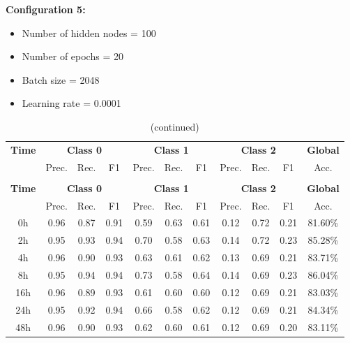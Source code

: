 \documentclass[12pt,oneside]{book} %
\begin{document}
\noindent \textbf{Configuration 5:}
\begin{multicols}{2}
    \begin{itemize}
        \item Number of hidden nodes = 100
        \item Number of epochs = 20
    \end{itemize}
    \begin{itemize}
         \item Batch size = 2048
         \item Learning rate = 0.0001
    \end{itemize}
\end{multicols}

\setlength\LTleft{1cm}
\begin{longtable}{ c ccc ccc ccc c}
\caption{Performance metrics of the LNN model for configuration 5} \\
\toprule
\textbf{Time} & \multicolumn{3}{c}{\textbf{Class 0}} & \multicolumn{3}{c}{\textbf{Class 1}} & \multicolumn{3}{c}{\textbf{Class 2}} & \textbf{Global} \\
               & Prec. & Rec. & F1  & Prec. & Rec. & F1   & Prec. & Rec. & F1  & Acc. \\
\midrule
\endfirsthead

\caption[]{(continued)} \\
\toprule
\textbf{Time} & \multicolumn{3}{c}{\textbf{Class 0}} & \multicolumn{3}{c}{\textbf{Class 1}} & \multicolumn{3}{c}{\textbf{Class 2}} & \textbf{Global} \\
               & Prec. & Rec. & F1  & Prec. & Rec. & F1   & Prec. & Rec. & F1  & Acc. \\
\midrule
\endhead

\bottomrule
\endfoot

\bottomrule
\endlastfoot

0h             & 0.96  & 0.87 & 0.91 & 0.59  & 0.63 & 0.61  & 0.12  & 0.72 & 0.21 & 81.60\% \\
2h             & 0.95  & 0.93 & 0.94 & 0.70  & 0.58 & 0.63  & 0.14  & 0.72 & 0.23 & 85.28\% \\
4h             & 0.96  & 0.90 & 0.93 & 0.63  & 0.61 & 0.62  & 0.13  & 0.69 & 0.21 & 83.71\% \\
8h             & 0.95  & 0.94 & 0.94 & 0.73  & 0.58 & 0.64  & 0.14  & 0.69 & 0.23 & 86.04\% \\
16h            & 0.96  & 0.89 & 0.93 & 0.61  & 0.60 & 0.60  & 0.12  & 0.69 & 0.21 & 83.03\% \\
24h            & 0.95  & 0.92 & 0.94 & 0.66  & 0.58 & 0.62  & 0.12  & 0.69 & 0.21 & 84.34\% \\
48h            & 0.96  & 0.90 & 0.93 & 0.62  & 0.60 & 0.61  & 0.12  & 0.69 & 0.20 & 83.11\% \\
\end{longtable}
\end{document}
